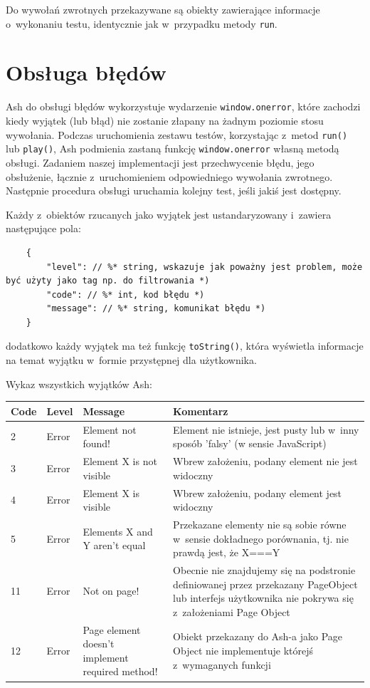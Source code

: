 \documentclass[brudnopis]{xmgr}
\begin{document}
Do wywołań zwrotnych przekazywane są obiekty zawierające informacje o~wykonaniu testu, identycznie jak w~przypadku metody \texttt{run}.

\section{Obsługa błędów}

Ash do obsługi błędów wykorzystuje wydarzenie \texttt{window.onerror}, które zachodzi kiedy wyjątek (lub błąd) nie zostanie złapany na żadnym poziomie stosu wywołania. Podczas uruchomienia zestawu testów, korzystając z~metod \texttt{run()} lub \texttt{play()}, Ash podmienia zastaną funkcję \texttt{window.onerror} własną metodą obsługi. Zadaniem naszej implementacji jest przechwycenie błędu, jego obsłużenie, łącznie z~uruchomieniem odpowiedniego wywołania zwrotnego. Następnie procedura obsługi uruchamia kolejny test, jeśli jakiś jest dostępny. 

Każdy z~obiektów rzucanych jako wyjątek jest ustandaryzowany i~zawiera następujące pola: 

\begin{lstlisting}
	{
		"level": // %* string, wskazuje jak poważny jest problem, może być użyty jako tag np. do filtrowania *) 
		"code": // %* int, kod błędu *)
		"message": // %* string, komunikat błędu *) 
	}
\end{lstlisting}

dodatkowo każdy wyjątek ma też funkcję \texttt{toString()}, która wyświetla informacje na temat wyjątku w~formie przystępnej dla użytkownika.

Wykaz wszystkich wyjątków Ash:

\begin{center}
    \begin{tabularx}{\textwidth}{ | p{1cm} | p{2cm} | X | X |}
    \hline
    Code & Level & Message & Komentarz \\ \hline
    2 & Error & Element not found! & Element nie istnieje, jest pusty lub w~inny sposób 'falsy' (w sensie JavaScript)  \\ \hline
    3 & Error & Element X is not visible & Wbrew założeniu, podany element nie jest widoczny  \\ \hline
    4 & Error & Element X is visible & Wbrew założeniu, podany element jest widoczny  \\ \hline
    5 & Error & Elements X and Y aren't equal & Przekazane elementy nie są sobie równe w~sensie dokładnego porównania, tj.  nie prawdą jest, że X===Y  \\ \hline
    11 & Error & Not on page! & Obecnie nie znajdujemy się na podstronie definiowanej przez przekazany PageObject lub interfejs użytkownika nie pokrywa się z~założeniami Page Object  \\ \hline
    12 & Error & Page element doesn't implement required method! & Obiekt przekazany do Ash-a jako Page Object nie implementuje którejś z~wymaganych funkcji  \\ \hline
    \end{tabularx}
\end{center}
\end{document}
